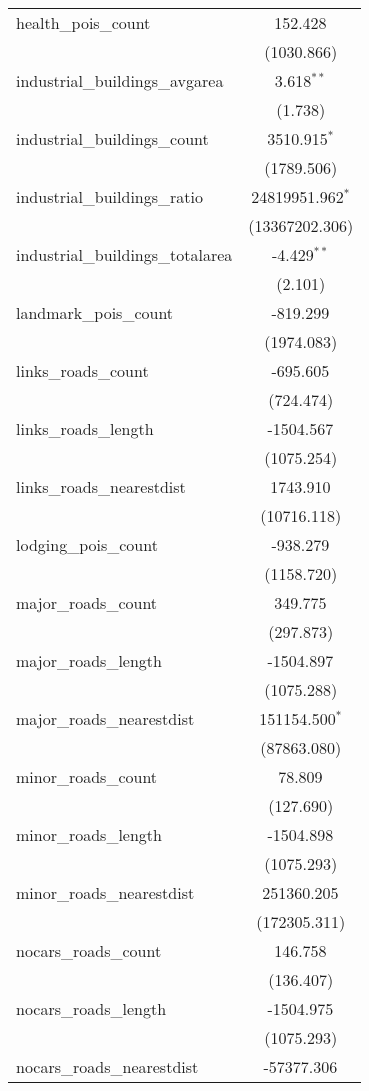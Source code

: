 \begin{table}[!htbp]
\begin{tabular}{@{\extracolsep{5pt}}lc}
 health_pois_count & 152.428$^{}$ \\
  & (1030.866) \\
 industrial_buildings_avgarea & 3.618$^{**}$ \\
  & (1.738) \\
 industrial_buildings_count & 3510.915$^{*}$ \\
  & (1789.506) \\
 industrial_buildings_ratio & 24819951.962$^{*}$ \\
  & (13367202.306) \\
 industrial_buildings_totalarea & -4.429$^{**}$ \\
  & (2.101) \\
 landmark_pois_count & -819.299$^{}$ \\
  & (1974.083) \\
 links_roads_count & -695.605$^{}$ \\
  & (724.474) \\
 links_roads_length & -1504.567$^{}$ \\
  & (1075.254) \\
 links_roads_nearestdist & 1743.910$^{}$ \\
  & (10716.118) \\
 lodging_pois_count & -938.279$^{}$ \\
  & (1158.720) \\
 major_roads_count & 349.775$^{}$ \\
  & (297.873) \\
 major_roads_length & -1504.897$^{}$ \\
  & (1075.288) \\
 major_roads_nearestdist & 151154.500$^{*}$ \\
  & (87863.080) \\
 minor_roads_count & 78.809$^{}$ \\
  & (127.690) \\
 minor_roads_length & -1504.898$^{}$ \\
  & (1075.293) \\
 minor_roads_nearestdist & 251360.205$^{}$ \\
  & (172305.311) \\
 nocars_roads_count & 146.758$^{}$ \\
  & (136.407) \\
 nocars_roads_length & -1504.975$^{}$ \\
  & (1075.293) \\
 nocars_roads_nearestdist & -57377.306$^{}$ \\

\end{tabular}
\end{table}
